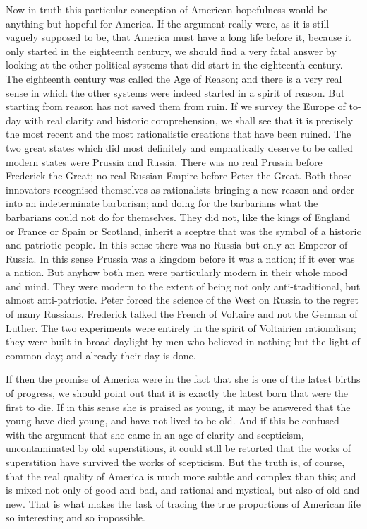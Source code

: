 \documentclass{book}
\begin{document}
Now in truth this particular conception of American hopefulness would be anything but hopeful for America. If the argument really were, as it is still vaguely supposed to be, that America must have a long life before it, because it only started in the eighteenth century, we should find a very fatal answer by looking at the other political systems that did start in the eighteenth century. The eighteenth century was called the Age of Reason; and there is a very real sense in which the other systems were indeed started in a spirit of reason. But starting from reason has not saved them from ruin. If we survey the Europe of to-day with real clarity and historic comprehension, we shall see that it is precisely the most recent and the most rationalistic creations that have been ruined. The two great states which did most definitely and emphatically deserve to be called modern states were Prussia and Russia. There was no real Prussia before Frederick the Great; no real Russian Empire before Peter the Great. Both those innovators recognised themselves as rationalists bringing a new reason and order into an indeterminate barbarism; and doing for the barbarians what the barbarians could not do for themselves. They did not, like the kings of England or France or Spain or Scotland, inherit a sceptre that was the symbol of a historic and patriotic people. In this sense there was no Russia but only an Emperor of Russia. In this sense Prussia was a kingdom before it was a nation; if it ever was a nation. But anyhow both men were particularly modern in their whole mood and mind. They were modern to the extent of being not only anti-traditional, but almost anti-patriotic. Peter forced the science of the West on Russia to the regret of many Russians. Frederick talked the French of Voltaire and not the German of Luther. The two experiments were entirely in the spirit of Voltairien rationalism; they were built in broad daylight by men who believed in nothing but the light of common day; and already their day is done.

If then the promise of America were in the fact that she is one of the latest births of progress, we should point out that it is exactly the latest born that were the first to die. If in this sense she is praised as young, it may be answered that the young have died young, and have not lived to be old. And if this be confused with the argument that she came in an age of clarity and scepticism, uncontaminated by old superstitions, it could still be retorted that the works of superstition have survived the works of scepticism. But the truth is, of course, that the real quality of America is much more subtle and complex than this; and is mixed not only of good and bad, and rational and mystical, but also of old and new. That is what makes the task of tracing the true proportions of American life so interesting and so impossible.
\end{document}
